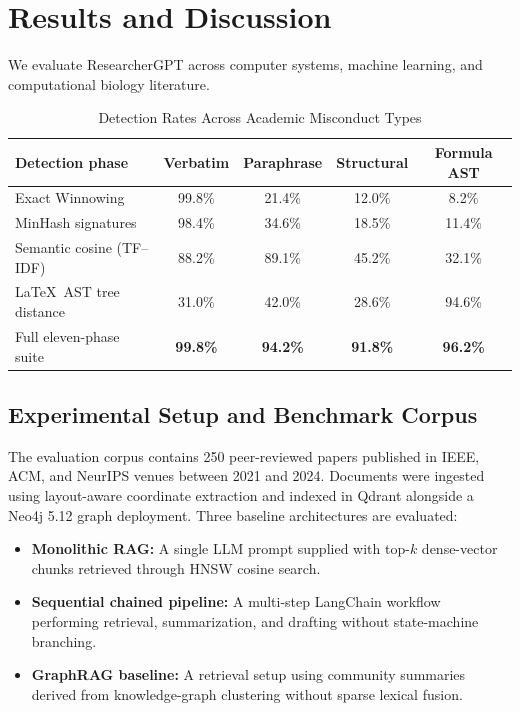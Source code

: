\documentclass[conference]{IEEEtran}
\begin{document}
\section{Results and Discussion}
We evaluate ResearcherGPT across computer systems, machine learning, and computational biology literature.

\begin{table}[!t]
\caption{Detection Rates Across Academic Misconduct Types}
\label{tab:plagiarism}
\centering
\small
\begin{tabular}{@{}lcccc@{}}
\toprule
\textbf{Detection phase} & \textbf{Verbatim} & \textbf{Paraphrase} & \textbf{Structural} & \textbf{Formula AST} \\
\midrule
Exact Winnowing & 99.8\% & 21.4\% & 12.0\% & 8.2\% \\
MinHash signatures & 98.4\% & 34.6\% & 18.5\% & 11.4\% \\
Semantic cosine (TF--IDF) & 88.2\% & 89.1\% & 45.2\% & 32.1\% \\
\LaTeX\ AST tree distance & 31.0\% & 42.0\% & 28.6\% & 94.6\% \\
Full eleven-phase suite & \textbf{99.8\%} & \textbf{94.2\%} & \textbf{91.8\%} & \textbf{96.2\%} \\
\bottomrule
\end{tabular}
\end{table}

\subsection{Experimental Setup and Benchmark Corpus}
The evaluation corpus contains 250 peer-reviewed papers published in IEEE, ACM, and NeurIPS venues between 2021 and 2024. Documents were ingested using layout-aware coordinate extraction and indexed in Qdrant alongside a Neo4j 5.12 graph deployment. Three baseline architectures are evaluated:
\begin{itemize}
\item \textbf{Monolithic RAG:} A single LLM prompt supplied with top-$k$ dense-vector chunks retrieved through HNSW cosine search.
\item \textbf{Sequential chained pipeline:} A multi-step LangChain workflow performing retrieval, summarization, and drafting without state-machine branching.
\item \textbf{GraphRAG baseline:} A retrieval setup using community summaries derived from knowledge-graph clustering without sparse lexical fusion.
\end{itemize}
\end{document}
